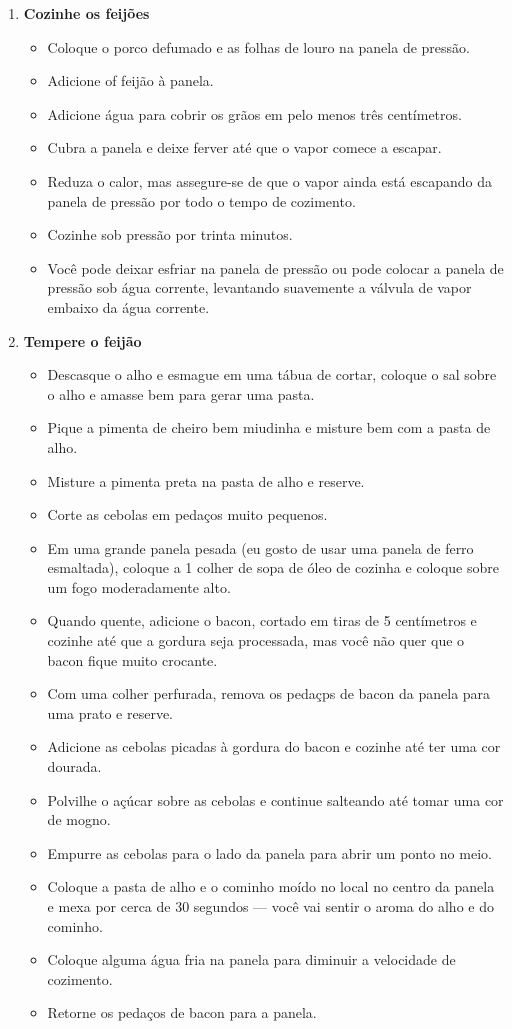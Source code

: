 \documentclass [11pt, letterpaper] {article}
\begin{document}
\begin {description}
\begin {enumerate}
\item {\bf Cozinhe os feijões}
\begin {itemize}
\item Coloque o porco defumado e as folhas de louro na panela de press\~ao.
\item Adicione of feij\~ao \`a panela.
\item Adicione água para cobrir os grãos em pelo menos tr\^es cent\'imetros.
\item Cubra a panela e deixe ferver até que o vapor comece a escapar.
\item Reduza o calor, mas assegure-se de que o vapor ainda está escapando da panela de pressão por todo o tempo de cozimento.
\item Cozinhe sob pressão por trinta minutos.
\item Você pode deixar esfriar na panela de pressão ou pode colocar a panela de pressão sob água corrente, levantando suavemente a válvula de vapor embaixo da água corrente.
\end {itemize}

\item {\bf Tempere o feijão}
\begin {itemize}
\item Descasque o alho e esmague em uma tábua de cortar, coloque o sal sobre o alho e amasse bem para gerar uma pasta.
\item Pique a pimenta de cheiro bem miudinha e misture bem com a pasta de alho.
\item Misture a pimenta preta na pasta de alho e reserve.
\item Corte as cebolas em peda\c{c}os muito pequenos.
\item Em uma grande panela pesada (eu gosto de usar uma panela de ferro esmaltada), coloque a 1 colher de sopa de óleo de cozinha e coloque sobre um fogo moderadamente alto.
\item Quando quente, adicione o bacon, cortado em tiras de 5 cent\'imetros e cozinhe até que a gordura seja processada, mas você não quer que o bacon fique muito crocante.
\item Com uma colher perfurada, remova os peda\c{c}ps de bacon da panela para uma prato e reserve.
\item Adicione as cebolas picadas à gordura do bacon e cozinhe até ter uma cor dourada.
\item Polvilhe o açúcar sobre as cebolas e continue salteando até tomar uma cor de mogno.
\item Empurre as cebolas para o lado da panela para abrir um ponto no meio.
\item Coloque a pasta de alho e o cominho moído no local no centro da panela e mexa por cerca de 30 segundos --- você vai sentir o aroma do alho e do cominho.
\item Coloque alguma água fria na panela para diminuir a velocidade de cozimento.
\item Retorne os peda\c{c}os de bacon para a panela.
\end {itemize}


\end{enumerate}
\end{description}
\end{document}
